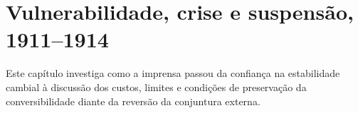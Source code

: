 \chapter{Vulnerabilidade, crise e suspensão, 1911--1914}

Este capítulo investiga como a imprensa passou da confiança na estabilidade cambial à discussão dos custos, limites e condições de preservação da conversibilidade diante da reversão da conjuntura externa.


